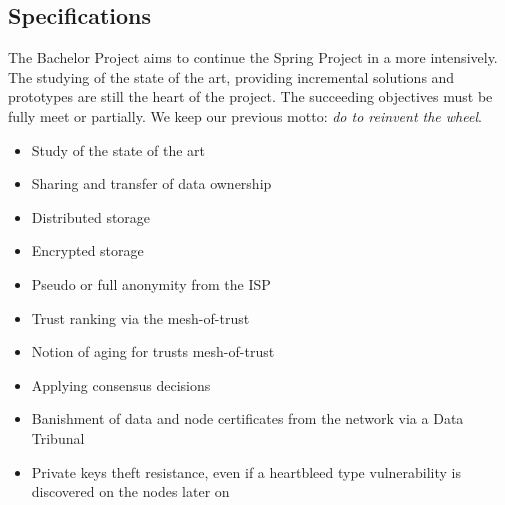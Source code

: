 
\subsection{Specifications}
The Bachelor Project aims to continue the Spring Project in a more intensively. The studying of the state of the art, providing incremental solutions and prototypes are still the heart of the project. The succeeding objectives must be fully meet or partially. We keep our previous motto: \textit{do to reinvent the wheel}.

\begin{itemize}
\item Study of the state of the art
\item Sharing and transfer of data ownership
\item Distributed storage
\item Encrypted storage
\item Pseudo or full anonymity from the ISP
\item Trust ranking via the mesh-of-trust
\item Notion of aging for trusts mesh-of-trust
\item Applying consensus decisions
\item Banishment of data and node certificates from the network via a Data Tribunal
\item Private keys  theft resistance, even if a heartbleed\cite{Mehta2014TheBug} type vulnerability is discovered on the nodes later on\cite{Sullivan2014StayingVulnerabilities}
\end{itemize}

